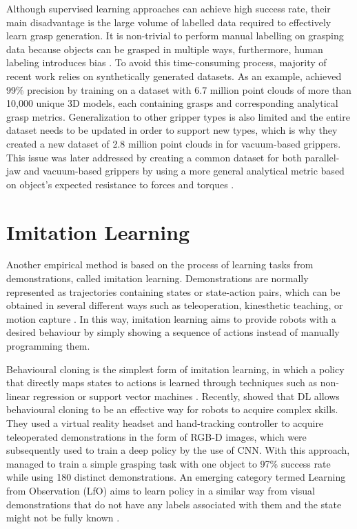 Although supervised learning approaches can achieve high success rate, their main disadvantage is the large volume of labelled data required to effectively learn grasp generation. It is non-trivial to perform manual labelling on grasping data because objects can be grasped in multiple ways, furthermore, human labeling introduces bias \cite{pinto_supersizing_2015}. To avoid this time-consuming process, majority of recent work relies on synthetically generated datasets. As an example, \citet{mahler_dex-net_2017} achieved 99\% precision by training on a dataset with 6.7 million point clouds of more than 10,000 unique 3D models, each containing grasps and corresponding analytical grasp metrics. Generalization to other gripper types is also limited and the entire dataset needs to be updated in order to support new types, which is why they created a new dataset of 2.8 million point clouds in \citeyear{mahler_dex-net_2018} for vacuum-based grippers. This issue was later addressed by creating a common dataset for both parallel-jaw and vacuum-based grippers by using a more general analytical metric based on object's expected resistance to forces and torques \cite{mahler_learning_2019}.


\section{Imitation Learning}

Another empirical method is based on the process of learning tasks from demonstrations, called imitation learning. Demonstrations are normally represented as trajectories containing states or state-action pairs, which can be obtained in several different ways such as teleoperation, kinesthetic teaching, or motion capture \cite{osa_algorithmic_2018}. In this way, imitation learning aims to provide robots with a desired behaviour by simply showing a sequence of actions instead of manually programming them. 

Behavioural cloning is the simplest form of imitation learning, in which a policy that directly maps states to actions is learned through techniques such as non-linear regression or support vector machines \cite{osa_algorithmic_2018}. Recently, \cite{zhang_deep_2018} showed that DL allows behavioural cloning to be an effective way for robots to acquire complex skills. They used a virtual reality headset and hand-tracking controller to acquire teleoperated demonstrations in the form of RGB-D images, which were subsequently used to train a deep policy by the use of CNN. With this approach, \citeauthor{zhang_deep_2018} managed to train a simple grasping task with one object to 97\% success rate while using 180 distinct demonstrations. An emerging category termed Learning from Observation (LfO) aims to learn policy in a similar way from visual demonstrations that do not have any labels associated with them and the state might not be fully known \cite{kroemer_review_2021}.

